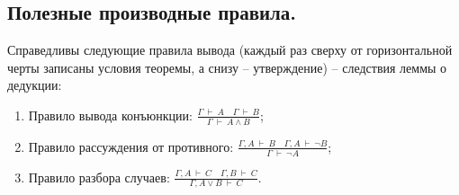 \subsection{Полезные производные правила.}

\begin{statement}
  Справедливы следующие правила вывода (каждый раз сверху от горизонтальной черты записаны условия теоремы, а снизу -- утверждение) -- следствия леммы о дедукции:
\end{statement}

\begin{enumerate}
  \item Правило вывода конъюнкции: $\frac{\Gamma \> \vdash \> A \quad \Gamma \> \vdash \> B}{\Gamma \> \vdash \> A \wedge B}$;
  \item Правило рассуждения от противного: $\frac{\Gamma, A \> \vdash \> B \quad \Gamma, A \> \vdash \> \neg B}{\Gamma \> \vdash \> \neg A}$;
  \item Правило разбора случаев: $\frac{\Gamma, A \> \vdash \> C \quad \Gamma, B \> \vdash \> C}{\Gamma, A \vee B \> \vdash \> C}$.
\end{enumerate}